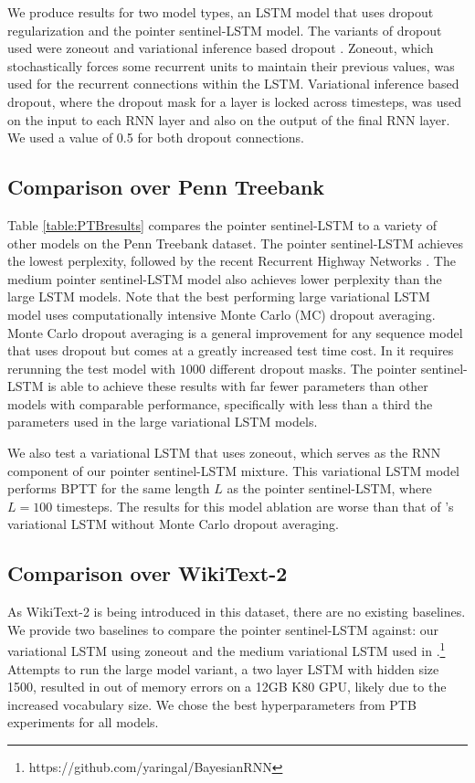 We produce results for two model types, an LSTM model that uses dropout regularization and the pointer sentinel-LSTM model. The variants of dropout used were zoneout \cite{Krueger2016} and variational inference based dropout \cite{Gal2015}. Zoneout, which stochastically forces some recurrent units to maintain their previous values, was used for the recurrent connections within the LSTM. Variational inference based dropout, where the dropout mask for a layer is locked across timesteps, was used on the input to each RNN layer and also on the output of the final RNN layer. We used a value of 0.5 for both dropout connections.

\subsection{Comparison over Penn Treebank} Table \ref{table:PTBresults} compares the pointer sentinel-LSTM to a variety of other models on the Penn Treebank dataset. The pointer sentinel-LSTM achieves the lowest perplexity, followed by the recent Recurrent Highway Networks \cite{Zilly2016}. The medium pointer sentinel-LSTM model also achieves lower perplexity than the large LSTM models. Note that the best performing large variational LSTM model uses computationally intensive Monte Carlo (MC) dropout averaging. Monte Carlo dropout averaging is a general improvement for any sequence model that uses dropout but comes at a greatly increased test time cost. In \citet{Gal2015} it requires rerunning the test model with $1000$ different dropout masks. The pointer sentinel-LSTM is able to achieve these results with far fewer parameters than other models with comparable performance, specifically with less than a third the parameters used in the large variational LSTM models.

We also test a variational LSTM that uses zoneout, which serves as the RNN component of our pointer sentinel-LSTM mixture. This variational LSTM model performs BPTT for the same length $L$ as the pointer sentinel-LSTM, where $L = 100$ timesteps. The results for this model ablation are worse than that of \citet{Gal2015}'s variational LSTM without Monte Carlo dropout averaging.

\subsection{Comparison over WikiText-2}

As WikiText-2 is being introduced in this dataset, there are no existing baselines. We provide two baselines to compare the pointer sentinel-LSTM against: our variational LSTM using zoneout and the medium variational LSTM used in \citet{Gal2015}.\footnote{https://github.com/yaringal/BayesianRNN}
Attempts to run the \citet{Gal2015} large model variant, a two layer LSTM with hidden size 1500, resulted in out of memory errors on a 12GB K80 GPU, likely due to the increased vocabulary size. We chose the best hyperparameters from PTB experiments for all models.

